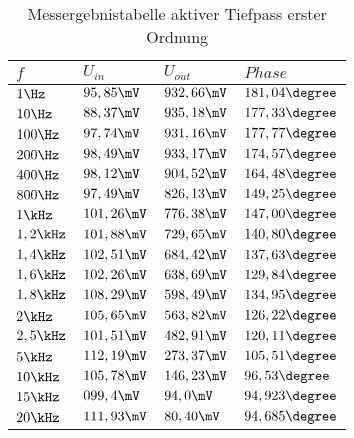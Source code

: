 \begin{table}[]
\centering
\caption{Messergebnistabelle aktiver Tiefpass erster Ordnung}
\label{tab:TP_erg_tab}
\begin{tabular}{|l|l|l|l|}
\hline
\rowcolor[HTML]{C0C0C0} 
$f     $&$ U_{in} $&$ U_{out} $&$ Phase  $\\ \hline
$1\Hz     $&$ 95,85\mV  $&$ 932,66\mV  $&$ 181,04\degree $\\ \hline
$10\Hz    $&$ 88,37\mV  $&$ 935,18\mV  $&$ 177,33\degree $\\ \hline
$100\Hz   $&$ 97,74\mV  $&$ 931,16\mV  $&$ 177,77\degree $\\ \hline
$200\Hz   $&$ 98,49\mV  $&$ 933,17\mV  $&$ 174,57\degree $\\ \hline
$400\Hz   $&$ 98,12\mV  $&$ 904,52\mV  $&$ 164,48\degree $\\ \hline
$800\Hz   $&$ 97,49\mV  $&$ 826,13\mV  $&$ 149,25\degree $\\ \hline
$1\kHz   $&$ 101,26\mV $&$ 776,38\mV  $&$ 147,00\degree $\\ \hline
$1,2\kHz $&$ 101,88\mV $&$ 729,65\mV  $&$ 140,80\degree $\\ \hline
$1,4\kHz $&$ 102,51\mV $&$ 684,42\mV  $&$ 137,63\degree $\\ \hline
$1,6\kHz $&$ 102,26\mV $&$ 638,69\mV  $&$ 129,84\degree $\\ \hline
$1,8\kHz $&$ 108,29\mV $&$ 598,49\mV  $&$ 134,95\degree $\\ \hline
$2\kHz   $&$ 105,65\mV $&$ 563,82\mV  $&$ 126,22\degree $\\ \hline
$2,5\kHz $&$ 101,51\mV $&$ 482,91\mV  $&$ 120,11\degree $\\ \hline
$5\kHz   $&$ 112,19\mV $&$ 273,37\mV  $&$ 105,51\degree $\\ \hline
$10\kHz  $&$ 105,78\mV $&$ 146,23\mV  $&$ 96,53\degree  $\\ \hline
$15\kHz  $&$ 099,4\mV  $&$ 94,0\mV    $&$ 94,923\degree $\\ \hline
$20\kHz  $&$ 111,93\mV $&$ 80,40\mV   $&$ 94,685\degree $\\ \hline
\end{tabular}
\end{table}